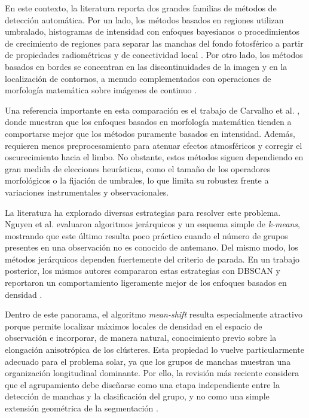 En este contexto, la literatura reporta dos grandes familias de métodos de detección automática. Por un lado, los métodos basados en regiones utilizan umbralado, histogramas de intensidad con enfoques bayesianos o procedimientos de crecimiento de regiones para separar las manchas del fondo fotosférico a partir de propiedades radiométricas y de conectividad local \citep{pettauer1997sunspots,steinegger1998thresholds,turmon2002pattern,murakozy2022asymmetries}. Por otro lado, los métodos basados en bordes se concentran en las discontinuidades de la imagen y en la localización de contornos, a menudo complementados con operaciones de morfología matemática sobre imágenes de continuo \citep{zharkov2005automated,scherrer1995mdi,curto2008morphology,watson2009wilson}.

Una referencia importante en esta comparación es el trabajo de Carvalho et al. \citep{carvalho2020comparison}, donde muestran que los enfoques basados en morfología matemática tienden a comportarse mejor que los métodos puramente basados en intensidad. Además, requieren menos preprocesamiento para atenuar efectos atmosféricos y corregir el oscurecimiento hacia el limbo. No obstante, estos métodos siguen dependiendo en gran medida de elecciones heurísticas, como el tamaño de los operadores morfológicos o la fijación de umbrales, lo que limita su robustez frente a variaciones instrumentales y observacionales.

La literatura ha explorado diversas estrategias para resolver este problema. Nguyen et al. \citep{nguyen2004learning} evaluaron algoritmos jerárquicos y un esquema simple de \textit{k-means}, mostrando que este último resulta poco práctico cuando el número de grupos presentes en una observación no es conocido de antemano. Del mismo modo, los métodos jerárquicos dependen fuertemente del criterio de parada. En un trabajo posterior, los mismos autores compararon estas estrategias con DBSCAN y reportaron un comportamiento ligeramente mejor de los enfoques basados en densidad \citep{nguyen2006hybrid,ester1996dbscan}.

Dentro de este panorama, el algoritmo \textit{mean-shift} resulta especialmente atractivo porque permite localizar máximos locales de densidad en el espacio de observación e incorporar, de manera natural, conocimiento previo sobre la elongación anisotrópica de los clústeres. Esta propiedad lo vuelve particularmente adecuado para el problema solar, ya que los grupos de manchas muestran una organización longitudinal dominante. Por ello, la revisión más reciente considera que el agrupamiento debe diseñarse como una etapa independiente entre la detección de manchas y la clasificación del grupo, y no como una simple extensión geométrica de la segmentación \citep{comaniciu2002mean,sayez2023sunscc}.

